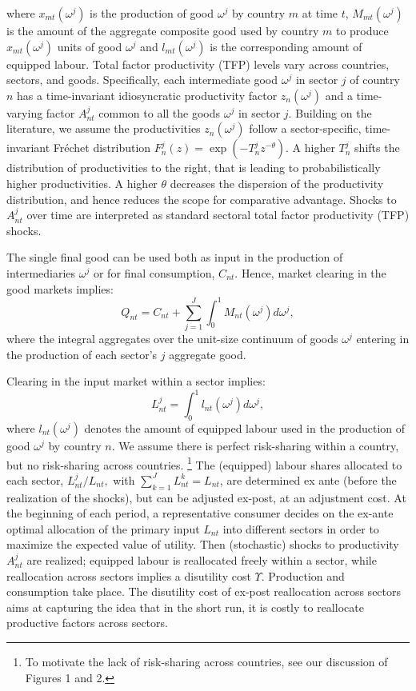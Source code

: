 \documentclass{article}
\begin{document}
where $x_{mt}(\omega ^{j})$ is the production of good $\omega ^{j}$ by
country $m$ at time $t$, $M_{mt}(\omega ^{j})$ is the amount of the
aggregate composite good used by country $m$ to produce $x_{mt}(\omega ^{j})$
units of good $\omega ^{j}$ and $l_{mt}(\omega ^{j})$ is the corresponding
amount of equipped labour. Total factor productivity (TFP) levels vary
across countries, sectors, and goods. Specifically, each intermediate good $%
\omega ^{j}$ in sector $j$ of country $n$ has a time-invariant idiosyncratic
productivity factor $z_{n}(\omega ^{j})$ and a time-varying factor $%
A_{nt}^{j}$ common to all the goods $\omega ^{j}$ in sector $j$. Building on
the literature, we assume the productivities $z_{n}(\omega ^{j})$ follow a
sector-specific, time-invariant Fr\'{e}chet distribution $F_{n}^{j}(z)=\exp
(-T_{n}^{j}z^{-\theta })$. A higher $T_{n}^{j}$ shifts the distribution of
productivities to the right, that is leading to probabilistically higher
productivities. A higher $\theta $ decreases the dispersion of the
productivity distribution, and hence reduces the scope for comparative
advantage. Shocks to $A_{nt}^{j}$ over time are interpreted as standard
sectoral total factor productivity (TFP) shocks.

The single final good can be used both as input in the production of
intermediaries $\omega^{j}$ or for final consumption, $C_{nt}$. Hence,
market clearing in the good markets implies: 
\[
Q_{nt} = C_{nt} + \sum_{j=1}^{J}\int_{0}^{1}M_{nt}(\omega^{j})d\omega ^{j},
\]
where the integral aggregates over the unit-size continuum of goods $%
\omega^{j}$ entering in the production of each sector's $j$ aggregate good.

Clearing in the input market within a sector implies: 
\[
L_{nt}^{j}=\int_{0}^{1}l_{nt}(\omega ^{j})d\omega ^{j},
\]%
where $l_{nt}(\omega ^{j})$ denotes the amount of equipped labour used in
the production of good $\omega ^{j}$ by country $n$. We assume there is
perfect risk-sharing within a country, but no risk-sharing across countries.%
\footnote{%
To motivate the lack of risk-sharing across countries, see our discussion of
Figures 1 and 2.} The (equipped) labour shares allocated to each sector, $%
L_{nt}^{j}/L_{nt},$ with $\sum\nolimits_{k=1}^{J}L_{nt}^{k}=L_{nt}$, are
determined ex ante (before the realization of the shocks), but can be
adjusted ex-post, at an adjustment cost. At the beginning of each period, a
representative consumer decides on the ex-ante optimal allocation of the
primary input $L_{nt}$ into different sectors in order to maximize the
expected value of utility. Then (stochastic) shocks to productivity $%
A_{nt}^{j}$ are realized; equipped labour is reallocated freely within a
sector, while reallocation across sectors implies a disutility cost $%
\Upsilon .$ Production and consumption take place. The disutility cost of
ex-post reallocation across sectors  aims at capturing the idea that in the
short run, it is costly to reallocate productive factors across sectors. 
\end{document}
